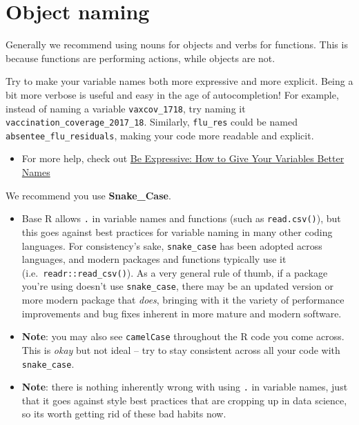 \documentclass[
]{book}
\providecommand{\tightlist}{%
  \setlength{\itemsep}{0pt}\setlength{\parskip}{0pt}}
\begin{document}
\section{Object naming}\label{object-naming}

Generally we recommend using nouns for objects and verbs for functions. This is because functions are performing actions, while objects are not.

Try to make your variable names both more expressive and more explicit. Being a bit more verbose is useful and easy in the age of autocompletion! For example, instead of naming a variable \texttt{vaxcov\_1718}, try naming it \texttt{vaccination\_coverage\_2017\_18}. Similarly, \texttt{flu\_res} could be named \texttt{absentee\_flu\_residuals}, making your code more readable and explicit.

\begin{itemize}
\tightlist
\item
  For more help, check out \href{https://spin.atomicobject.com/2017/11/01/good-variable-names/}{Be Expressive: How to Give Your Variables Better Names}
\end{itemize}

We recommend you use \textbf{Snake\_Case}.

\begin{itemize}
\item
  Base R allows \texttt{.} in variable names and functions (such as \texttt{read.csv()}), but this goes against best practices for variable naming in many other coding languages. For consistency's sake, \texttt{snake\_case} has been adopted across languages, and modern packages and functions typically use it (i.e.~\texttt{readr::read\_csv()}). As a very general rule of thumb, if a package you're using doesn't use \texttt{snake\_case}, there may be an updated version or more modern package that \emph{does}, bringing with it the variety of performance improvements and bug fixes inherent in more mature and modern software.
\item
  \textbf{Note}: you may also see \texttt{camelCase} throughout the R code you come across. This is \emph{okay} but not ideal -- try to stay consistent across all your code with \texttt{snake\_case}.
\item
  \textbf{Note}: there is nothing inherently wrong with using \texttt{.} in variable names, just that it goes against style best practices that are cropping up in data science, so its worth getting rid of these bad habits now.
\end{itemize}
\end{document}
